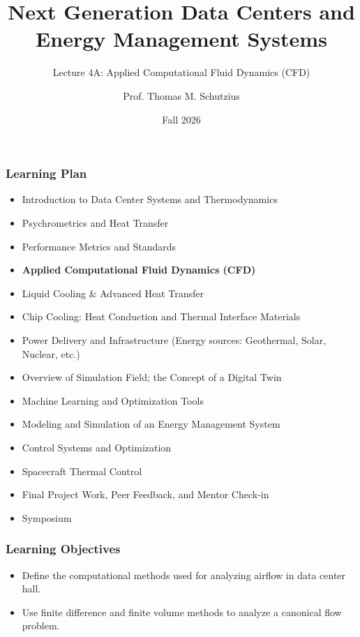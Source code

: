 \documentclass[aspectratio=169,10pt,xcolor={table,dvipsnames},t]{beamer}
\title[lecture 02]{Next Generation Data Centers and Energy Management Systems}
\subtitle{Lecture 4A: Applied Computational Fluid Dynamics (CFD)}
\author{Prof. Thomas M. Schutzius}
\institute{Department of Mechanical Engineering}
\date{Fall 2026}
\begin{document}
\begin{frame}
  \titlepage
\end{frame}


{
\smallframetitle
	\begin{frame}
		\frametitle{Learning Plan}
		\begin{itemize}
			\item Introduction to Data Center Systems and Thermodynamics 
			\item Psychrometrics and Heat Transfer
			\item Performance Metrics and Standards
			\item \textbf{Applied Computational Fluid Dynamics (CFD)}
			\item Liquid Cooling \& Advanced Heat Transfer 
			\item Chip Cooling: Heat Conduction and Thermal Interface Materials 
			\item Power Delivery and Infrastructure (Energy sources: Geothermal, Solar, Nuclear, etc.)
			\item Overview of Simulation Field; the Concept of a Digital Twin 
			\item Machine Learning and Optimization Tools 
			\item Modeling and Simulation of an Energy Management System 
			\item Control Systems and Optimization 
			\item Spacecraft Thermal Control
			\item Final Project Work, Peer Feedback, and Mentor Check-in 
			\item Symposium 
		\end{itemize}		
	\end{frame}
}

{
\smallframetitle
	\begin{frame}
		\frametitle{Learning Objectives}
		\begin{itemize}
			\item Define the computational methods used for analyzing airflow in data center hall.
			\item Use finite difference and finite volume methods to analyze a canonical flow problem.
		\end{itemize}		
	\end{frame}
}
\end{document}
